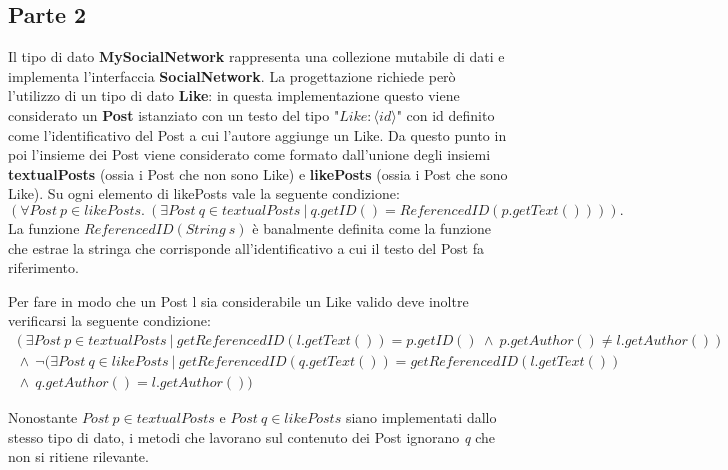 \documentclass[10pt, italian, openany]{book}
\begin{document}
\subsection{Parte 2}
Il tipo di dato \textbf{MySocialNetwork} rappresenta una collezione mutabile di dati e implementa l'interfaccia \textbf{SocialNetwork}. La progettazione richiede per\`o l'utilizzo di un tipo di dato \textbf{Like}:
in questa implementazione questo viene considerato un \textbf{Post} istanziato con un testo del tipo "\(Like: \langle id \rangle\)" con id definito come l'identificativo del Post a cui l'autore aggiunge un Like.
Da questo punto in poi l'insieme dei Post viene considerato come formato dall'unione degli insiemi \textbf{textualPosts} (ossia i Post che non sono Like) e \textbf{likePosts} (ossia i Post che sono Like).
Su ogni elemento di likePosts vale la seguente condizione:
\[ (\forall Post \ p \in likePosts. \ (\exists Post \ q \in textualPosts \ | \ q.getID() = ReferencedID(p.getText()))). \]
La funzione \(ReferencedID(String \ s)\) \`e banalmente definita come la funzione che estrae la stringa che corrisponde all'identificativo a cui il testo del Post fa riferimento.

Per fare in modo che un Post l sia considerabile un Like valido deve inoltre verificarsi la seguente condizione:
\begin{gather*}
(\exists Post \ p \in textualPosts \ | \ getReferencedID(l.getText()) = p.getID() \ \wedge \ p.getAuthor() \neq l.getAuthor()) \\
\ \wedge \ \neg(\exists Post \ q \in likePosts \ | \ getReferencedID(q.getText()) = getReferencedID(l.getText()) \\
\ \wedge \ q.getAuthor() = l.getAuthor())
\end{gather*}

Nonostante \(Post \ p \in textualPosts\) e \(Post \ q \in likePosts\) siano implementati dallo stesso tipo di dato, i metodi che lavorano sul contenuto dei Post ignorano \textit{q} che non si ritiene rilevante.
\end{document}
